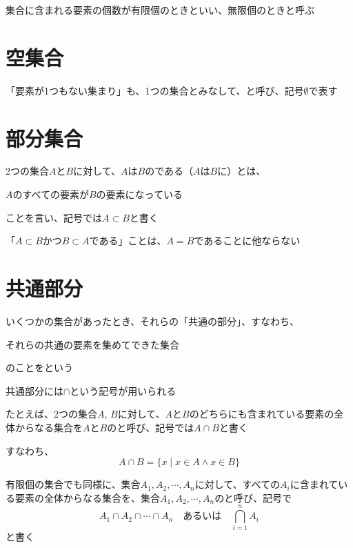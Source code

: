 \documentclass[b5paper,12pt]{jsarticle}
\begin{document}
集合に含まれる要素の個数が有限個のときといい、無限個のときと呼ぶ

\sectionline
\section{空集合}

「要素が1つもない集まり」も、1つの集合とみなして、と呼び、記号$\emptyset$で表す

\sectionline
\section{部分集合}

2つの集合$A$と$B$に対して、$A$は$B$のである（$A$は$B$に）とは、
\begin{shaded}
  $A$のすべての要素が$B$の要素になっている
\end{shaded}
ことを言い、記号では$A \subset B$と書く

\br

「$A \subset B$かつ$B \subset A$である」ことは、$A = B$であることに他ならない

\sectionline
\section{共通部分}

いくつかの集合があったとき、それらの「共通の部分」、すなわち、
\begin{shaded}
  それらの共通の要素を集めてできた集合
\end{shaded}
のことをという

共通部分には$\cap$という記号が用いられる

\sectionline

たとえば、2つの集合$A,\,B$に対して、$A$と$B$のどちらにも含まれている要素の全体からなる集合を$A$と$B$のと呼び、記号では$A \cap B$と書く

\br

すなわち、
\begin{equation*}
  A \cap B = \{x \mid x \in A \land x \in B\}
\end{equation*}

\sectionline

有限個の集合でも同様に、集合$A_1, A_2, \cdots , A_n$に対して、すべての$A_i$に含まれている要素の全体からなる集合を、集合$A_1, A_2, \cdots , A_n$のと呼び、記号で
\begin{equation*}
  A_1 \cap A_2 \cap \cdots \cap A_n \quad \text{あるいは} \quad \bigcap_{i=1}^n A_i
\end{equation*}
と書く
\end{document}
